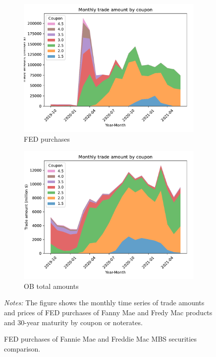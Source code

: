 \documentclass[11pt,a4paper]{article}
\begin{document}
\begin{figure}[h]
  \centering
  \begin{subfigure}[b]{0.7\textwidth}
    \includegraphics[width=0.998\textwidth]{../results/figures/fed_monthly_trade_amount_by_coupon.pdf}
    \caption{FED purchases}
   \end{subfigure}
   \begin{subfigure}[b]{0.7\textwidth}
    \includegraphics[width=0.998\textwidth]{../results/figures/ob_monthly_trade_amount_by_coupon_all_area.pdf}
    \caption{OB total amounts}
   \end{subfigure}
   \caption{FED purchases of Fannie Mae and Freddie Mac MBS securities comparison.} 
   \begin{minipage}{\textwidth}
    \footnotesize{\textit{Notes:} The figure shows the monthly time series of trade amounts and prices of FED purchases of Fanny Mae and Fredy Mac products and 30-year maturity by coupon or noterates. } 
      \end{minipage}
\end{figure}
\end{document}
